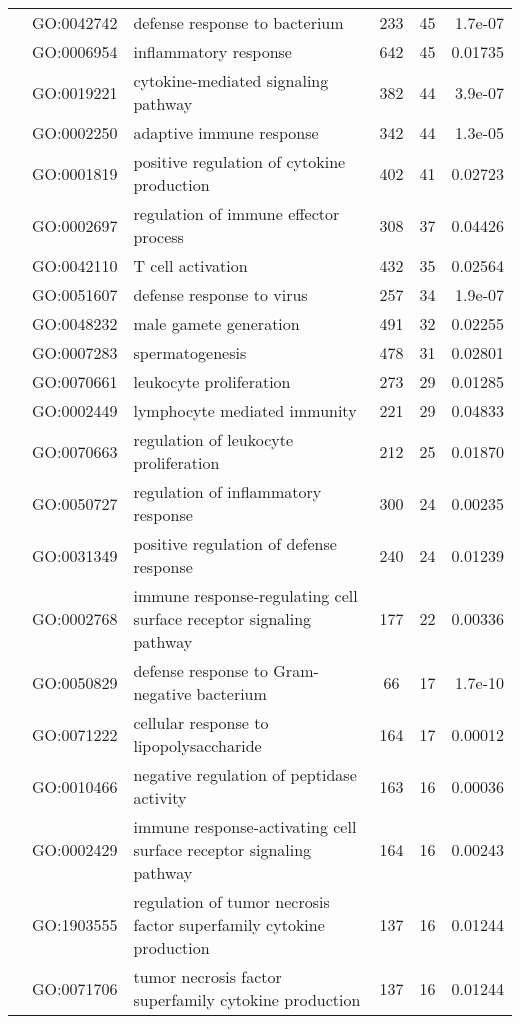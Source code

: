 \documentclass[../main.tex]{subfiles}
\begin{document}
\begin{landscape}
\begin{longtable}{@{}lllccr@{}}
     & GO:0042742 & defense response to bacterium & 233 & 45 & 1.7e-07 \\
     & GO:0006954 & inflammatory response & 642 & 45 & 0.01735 \\
     & GO:0019221 & cytokine-mediated signaling pathway & 382 & 44 & 3.9e-07 \\
     & GO:0002250 & adaptive immune response & 342 & 44 & 1.3e-05 \\
     & GO:0001819 & positive regulation of cytokine production & 402 & 41 & 0.02723 \\
     & GO:0002697 & regulation of immune effector process & 308 & 37 & 0.04426 \\
     & GO:0042110 & T cell activation & 432 & 35 & 0.02564 \\
     & GO:0051607 & defense response to virus & 257 & 34 & 1.9e-07 \\
     & GO:0048232 & male gamete generation & 491 & 32 & 0.02255 \\
     & GO:0007283 & spermatogenesis & 478 & 31 & 0.02801 \\
     & GO:0070661 & leukocyte proliferation & 273 & 29 & 0.01285 \\
     & GO:0002449 & lymphocyte mediated immunity & 221 & 29 & 0.04833 \\
     & GO:0070663 & regulation of leukocyte proliferation & 212 & 25 & 0.01870 \\
     & GO:0050727 & regulation of inflammatory response & 300 & 24 & 0.00235 \\
     & GO:0031349 & positive regulation of defense response & 240 & 24 & 0.01239 \\
     & GO:0002768 & immune response-regulating cell surface receptor signaling pathway & 177 & 22 & 0.00336 \\
     & GO:0050829 & defense response to Gram-negative bacterium & 66 & 17 & 1.7e-10 \\
     & GO:0071222 & cellular response to lipopolysaccharide & 164 & 17 & 0.00012 \\
     & GO:0010466 & negative regulation of peptidase activity & 163 & 16 & 0.00036 \\
     & GO:0002429 & immune response-activating cell surface receptor signaling pathway & 164 & 16 & 0.00243 \\
     & GO:1903555 & regulation of tumor necrosis factor superfamily cytokine production & 137 & 16 & 0.01244 \\
     & GO:0071706 & tumor necrosis factor superfamily cytokine production & 137 & 16 & 0.01244 \\

\end{longtable}
\end{landscape}
\end{document}
